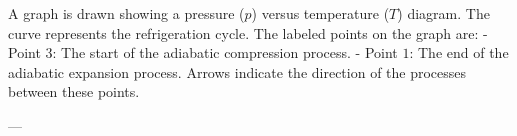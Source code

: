 A graph is drawn showing a pressure (\(p\)) versus temperature (\(T\)) diagram. The curve represents the refrigeration cycle. The labeled points on the graph are:  
- Point \(3\): The start of the adiabatic compression process.  
- Point \(1\): The end of the adiabatic expansion process.  
Arrows indicate the direction of the processes between these points.

---